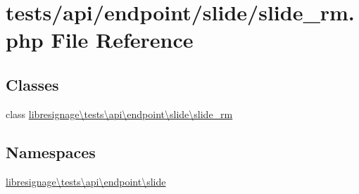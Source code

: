 \hypertarget{tests_2api_2endpoint_2slide_2slide__rm_8php}{}\section{tests/api/endpoint/slide/slide\+\_\+rm.php File Reference}
\label{tests_2api_2endpoint_2slide_2slide__rm_8php}
\subsection*{Classes}
\begin{DoxyCompactItemize}
\item 
class \hyperlink{classlibresignage_1_1tests_1_1api_1_1endpoint_1_1slide_1_1slide__rm}{libresignage\textbackslash{}tests\textbackslash{}api\textbackslash{}endpoint\textbackslash{}slide\textbackslash{}slide\+\_\+rm}
\end{DoxyCompactItemize}
\subsection*{Namespaces}
\begin{DoxyCompactItemize}
\item 
 \hyperlink{namespacelibresignage_1_1tests_1_1api_1_1endpoint_1_1slide}{libresignage\textbackslash{}tests\textbackslash{}api\textbackslash{}endpoint\textbackslash{}slide}
\end{DoxyCompactItemize}
